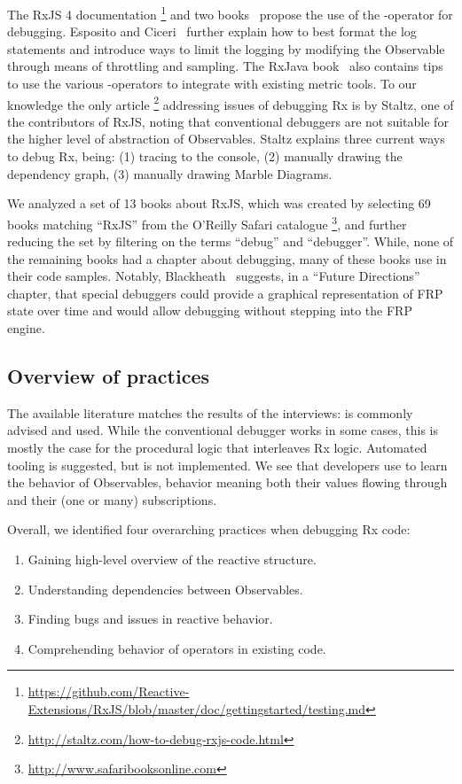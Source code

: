 The RxJS 4 documentation%
\footnote{ \url{https://github.com/Reactive-Extensions/RxJS/blob/master/doc/gettingstarted/testing.md}
} and two books~\cite{esposito2016reactive,rxjavabook2016} propose the
use of the -operator for debugging.  Esposito and Ciceri~\cite{esposito2016reactive}
further explain how to best format the log statements and introduce ways
to limit the logging by modifying the Observable through means of
throttling and sampling.  The RxJava book~\cite{rxjavabook2016} also
contains tips to use the various -operators to integrate with
existing metric tools.  To our knowledge the only article%
\footnote{\url{http://staltz.com/how-to-debug-rxjs-code.html}} addressing
issues of debugging Rx is by Staltz, one of the contributors of RxJS, noting
that conventional debuggers are not suitable for the higher level of
abstraction of Observables.  Staltz explains three current ways to debug
Rx, being:  (1) tracing to the console, (2) manually drawing the
dependency graph, (3) manually drawing Marble Diagrams.

We analyzed a set of 13 books about RxJS, which was created by selecting
69 books matching ``RxJS'' from the O'Reilly Safari catalogue%
\footnote{\url{http://www.safaribooksonline.com}}, and further reducing
the set by filtering on the terms ``debug'' and ``debugger''.  While,
none of the remaining books had a chapter about debugging, many of these
books use \printfdebugging{} in their code samples.  Notably, 
Blackheath~\cite{frpbook2016} suggests, in a ``Future Directions'' chapter, 
that special debuggers could provide a graphical representation of FRP
state over time and would allow debugging without stepping into the FRP engine.

\subsection{Overview of practices} The available literature matches the
results of the interviews:  \printfdebugging{} is commonly advised and
used.  While the conventional debugger works in some cases, this is
mostly the case for the procedural logic that interleaves Rx logic.
Automated tooling is suggested, but is not implemented.  We see that
developers use \printfdebugging{} to learn the behavior of Observables,
behavior meaning both their values flowing through and their (one or
many) subscriptions.

Overall, we identified four overarching practices when debugging Rx code:
\begin{enumerate}
        \itemsep0em
    \item[(1)]
        Gaining high-level overview of the reactive structure.
    \item[(2)]
        Understanding dependencies between Observables.
    \item[(3)]
        Finding bugs and issues in reactive behavior.
    \item[(4)]
        Comprehending behavior of operators in existing code.
\end{enumerate}
